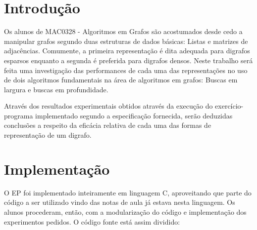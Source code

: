 \documentclass[brazil,times]{abnt}
\begin{document}





\data{\today}

\capa
\folhaderosto


\section*{Introdução}
Os alunos de MAC0328 - Algoritmos em Grafos são acostumados desde cedo a manipular grafos segundo duas estruturas de dados básicas: Listas e matrizes de adjacências. Comumente, a primeira representação é dita adequada para digrafos esparsos enquanto a segunda é preferida para digrafos densos. Neste trabalho será feita uma investigação das performances de cada uma das representações no uso de dois algoritmos fundamentais na área de algoritmos em grafos: Buscas em largura e buscas em profundidade.

Através dos resultados experimentais obtidos através da execução do exercício-programa implementado segundo a especificação fornecida, serão deduzidas conclusões a respeito da eficácia relativa de cada uma das formas de representação de um digrafo.


\section*{Implementação}
O EP foi implementado inteiramente em linguagem C, aproveitando que parte do código a ser utilizado vindo das notas de aula já estava nesta linguagem. Os alunos procederam, então, com a modularização do código e implementação dos experimentos pedidos. O código fonte está assim dividido:
\end{document}
